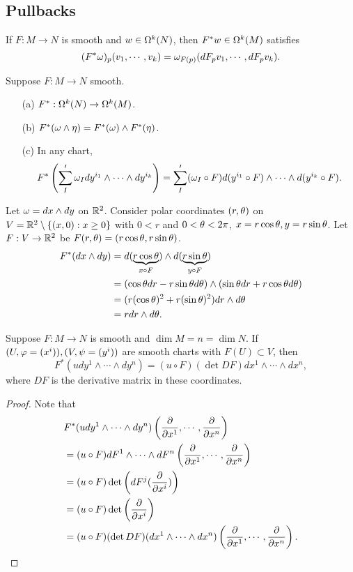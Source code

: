 \subsection{Pullbacks}
If $F:M \to N$ is smooth and $w \in \Omega^k(N)$, then $F^*w \in \Omega^k(M)$ satisfies 
$$(F^*\omega)_p(v_1,\cdots,v_k) = \omega_{F(p)}(dF_pv_1,\cdots,dF_pv_k).$$
\begin{lemma}\label{14.16}
    Suppose $F:M \to N$ smooth.
    \begin{enumerate}
    \item[(a)] $F^*:\Omega^k(N) \to \Omega^k(M)$.
    \item[(b)] $F^*(\omega \wedge \eta) = F^*(\omega) \wedge F^*(\eta)$.
    \item[(c)] In any chart, 
    $$F^*\left(\sum_{I}' \omega_I dy^{i_1} \wedge \cdots \wedge dy^{i_k} \right)
    = \sum_I'(\omega_I \circ F) d(y^{i_1} \circ F) \wedge \cdots \wedge d(y^{i_k} \circ F).$$
    \end{enumerate}
\end{lemma}
\begin{example}\label{14.19}
    Let $\omega = dx \wedge dy$ on $\mathbb{R}^2$. Consider polar coordinates $(r,\theta)$ on $V=\mathbb{R}^2 \setminus \{(x,0): x \geq 0\}$ with $0<r$ and $0<\theta<2\pi$, $x = r\cos \theta, y = r\sin \theta$.
    Let $F:V \to \mathbb{R}^2$ be $F(r,\theta) = (r\cos \theta, r\sin \theta)$. 
    \begin{align*}
    F^*(dx \wedge dy) 
    &= d(\underbrace{r\cos \theta}_{x \circ F}) \wedge d(\underbrace{r \sin \theta}_{y \circ F}) \\
    &= (\cos \theta dr - r\sin \theta d\theta) \wedge (\sin \theta dr + r\cos \theta d\theta) \\
    &= (r(\cos \theta)^2 + r(\sin \theta)^2) dr \wedge d\theta \\
    &= rdr \wedge d\theta.
    \end{align*}
\end{example}
\begin{proposition}\label{14.20}
    Suppose $F:M \to N$ is smooth and $\dim M = n = \dim N$. If $(U,\varphi=(x^i)), (V,\psi=(y^i))$ are smooth charts with $F(U) \subset V$, then 
    $$F^*(u dy^1 \wedge \cdots \wedge dy^n) = (u \circ F) (\det DF) dx^1 \wedge \cdots \wedge dx^n, $$ where $DF$ is the derivative matrix in these coordinates. 
\end{proposition}
\begin{proof}
    Note that 
    \begin{align*}
    &F^*(udy^1 \wedge \cdots \wedge dy^n)\left(
    \pdv{}{x^1}, \cdots, \pdv{}{x^n}
    \right) \\
    &= (u \circ F)dF^1 \wedge \cdots \wedge dF^n\left(
    \pdv{}{x^1}, \cdots, \pdv{}{x^n}
    \right) \\
    &= (u \circ F) \det \left(
    dF^j(\pdv{}{x^i})
    \right) \\
    &= (u \circ F) \det \left(
    \pdv{}{x^i}
    \right) \\
    &= (u \circ F)(\det DF)(dx^1 \wedge \cdots \wedge dx^n) \left(
    \pdv{}{x^1}, \cdots, \pdv{}{x^n}
    \right).
    \end{align*}
\end{proof}
